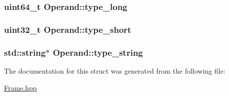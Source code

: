 \subsubsection[{\texorpdfstring{type\+\_\+long}{type_long}}]{\setlength{\rightskip}{0pt plus 5cm}uint64\+\_\+t Operand\+::type\+\_\+long}\hypertarget{struct_operand_acba3d813258f86827e414fb6e6fb6963}{}\label{struct_operand_acba3d813258f86827e414fb6e6fb6963}
\subsubsection[{\texorpdfstring{type\+\_\+short}{type_short}}]{\setlength{\rightskip}{0pt plus 5cm}uint32\+\_\+t Operand\+::type\+\_\+short}\hypertarget{struct_operand_a9a95367e26a5d3016da0b6d9fc9f0359}{}\label{struct_operand_a9a95367e26a5d3016da0b6d9fc9f0359}
\subsubsection[{\texorpdfstring{type\+\_\+string}{type_string}}]{\setlength{\rightskip}{0pt plus 5cm}std\+::string$\ast$ Operand\+::type\+\_\+string}\hypertarget{struct_operand_ab339ad43cfc3f1c32be042769846f049}{}\label{struct_operand_ab339ad43cfc3f1c32be042769846f049}


The documentation for this struct was generated from the following file\+:\begin{DoxyCompactItemize}
\item 
\hyperlink{_frame_8hpp}{Frame.\+hpp}\end{DoxyCompactItemize}

